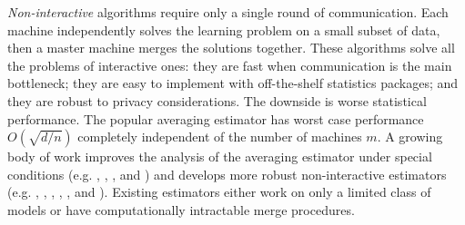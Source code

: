 \documentclass[thesis.tex]{subfiles}
\begin{document}
\emph{Non-interactive} algorithms require only a single round of communication.
Each machine independently solves the learning problem on a small subset of data,
then a master machine merges the solutions together.
These algorithms solve all the problems of interactive ones:
they are fast when communication is the main bottleneck;
they are easy to implement with off-the-shelf statistics packages;
and they are robust to privacy considerations.
The downside is worse statistical performance.
The popular averaging estimator has worst case performance $O(\sqrt{d/n})$ completely independent of the number of machines $m$. 
A growing body of work improves the analysis of the averaging estimator under special conditions 
(e.g.
\citet{mcdonald2009efficient},
\citet{zhang2012communication},
\citet{zhang2013divide},
and
\citet{rosenblatt2016optimality})
and develops more robust non-interactive estimators
(e.g.
\citet{zinkevich2010parallelized},
\citet{liu2014distributed},  
\citet{lee2015communication}, 
\citet{battey2015distributed},
\citet{han2016bootstrap},
and \citet{jordan2016communication}).
Existing estimators either work on only a limited class of models or have computationally intractable merge procedures.

\end{document}

